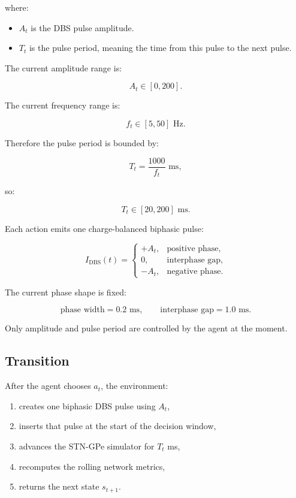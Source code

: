 \documentclass[11pt]{article}
\begin{document}
where:

\begin{itemize}[nosep]
    \item \(A_t\) is the DBS pulse amplitude.
    \item \(T_t\) is the pulse period, meaning the time from this pulse to the
    next pulse.
\end{itemize}

The current amplitude range is:

\[
A_t \in [0, 200].
\]

The current frequency range is:

\[
f_t \in [5, 50] \text{ Hz}.
\]

Therefore the pulse period is bounded by:

\[
T_t = \frac{1000}{f_t} \text{ ms},
\]

so:

\[
T_t \in [20, 200] \text{ ms}.
\]

Each action emits one charge-balanced biphasic pulse:

\[
I_{\text{DBS}}(t) =
\begin{cases}
+A_t, & \text{positive phase}, \\
0, & \text{interphase gap}, \\
-A_t, & \text{negative phase}.
\end{cases}
\]

The current phase shape is fixed:

\[
\text{phase width} = 0.2 \text{ ms}, \qquad
\text{interphase gap} = 1.0 \text{ ms}.
\]

Only amplitude and pulse period are controlled by the agent at the moment.

\subsection{Transition}

After the agent chooses \(a_t\), the environment:

\begin{enumerate}[nosep]
    \item creates one biphasic DBS pulse using \(A_t\),
    \item inserts that pulse at the start of the decision window,
    \item advances the STN-GPe simulator for \(T_t\) ms,
    \item recomputes the rolling network metrics,
    \item returns the next state \(s_{t+1}\).
\end{enumerate}
\end{document}
